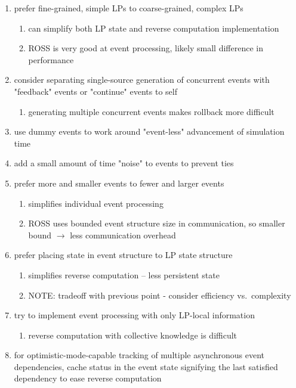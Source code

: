 \documentclass[conference,10pt,compsocconf,onecolumn]{IEEEtran}
\begin{document}
\begin{enumerate}

    \item prefer fine-grained, simple LPs to coarse-grained, complex LPs
    \begin{enumerate}
        \item can simplify both LP state and reverse computation implementation
        \item ROSS is very good at event processing, likely small difference in
            performance
    \end{enumerate}

    \item consider separating single-source generation of concurrent events with
        "feedback" events or "continue" events to self
    \begin{enumerate}
        \item generating multiple concurrent events makes rollback more difficult
    \end{enumerate}

    \item use dummy events to work around "event-less" advancement of simulation time 

    \item add a small amount of time "noise" to events to prevent ties

    \item prefer more and smaller events to fewer and larger events
    \begin{enumerate}
        \item simplifies individual event processing
        \item ROSS uses bounded event structure size in communication, so
            smaller bound $\rightarrow$  less communication overhead
    \end{enumerate}

    \item prefer placing state in event structure to LP state structure
    \begin{enumerate}
        \item simplifies reverse computation -- less persistent state
        \item NOTE: tradeoff with previous point - consider efficiency vs.\
            complexity
    \end{enumerate}

    \item try to implement event processing with only LP-local information
    \begin{enumerate}
        \item reverse computation with collective knowledge is difficult
    \end{enumerate}

    \item for optimistic-mode-capable tracking of multiple asynchronous event
        dependencies, cache status in the event state signifying the last
        satisfied dependency to ease reverse computation

\end{enumerate}
\end{document}
